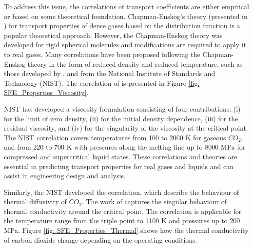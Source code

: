 \documentclass[../Article_Model_Parameters.tex]{subfiles}
\begin{document}
	To address this issue, the correlations of transport coefficients are either empirical or based on some theoretical foundation. Chapman-Enskog's theory (presented in \citet{Chapman1991}) for transport properties of dense gases based on the distribution function is a popular theoretical approach. However, the Chapman-Enskog theory was developed for rigid spherical molecules and modifications are required to apply it to real gases. Many correlations have been proposed following the Chapman-Enskog theory in the form of reduced density and reduced temperature, such as those developed by \citet{Fenghour1998}, and \citet{Laesecke2017} from the National Institute of Standards and Technology (NIST). The correlation of \citet{Laesecke2017} is presented in Figure \ref{fig: SFE_Properties_Viscosity}.
	
	NIST has developed a viscosity formulation consisting of four contributions: (i) for the limit of zero density, (ii) for the initial density dependence, (iii) for the residual viscosity, and (iv) for the singularity of the viscosity at the critical point. The NIST correlation covers temperatures from 100 to 2000 K for gaseous $CO_2$, and from 220 to 700 K with pressures along the melting line up to 8000 MPa for compressed and supercritical liquid states. These correlations and theories are essential in predicting transport properties for real gases and liquids and can assist in engineering design and analysis.
	
	
	Similarly, the NIST developed the correlation, which describe the behaviour of thermal diffusivity of $CO_2$. The work of \citet{Huber2016} captures the singular behaviour of thermal conductivity around the critical point. The correlation is applicable for the temperature range from the triple point to 1100 K and pressures up to 200 MPa. Figure \ref{fig: SFE_Properties_Thermal} shows how the thermal conductivity of carbon dioxide change depending on the operating conditions.
	
\end{document}

